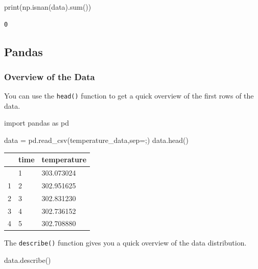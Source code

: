 \documentclass[
  letterpaper,
  DIV=11,
  numbers=noendperiod]{scrreprt}
\newenvironment{Shaded}{\begin{snugshade}}{\end{snugshade}}
\newcommand{\BuiltInTok}[1]{\textcolor[rgb]{0.00,0.23,0.31}{#1}}
\newcommand{\ImportTok}[1]{\textcolor[rgb]{0.00,0.46,0.62}{#1}}
\newcommand{\NormalTok}[1]{\textcolor[rgb]{0.00,0.23,0.31}{#1}}
\newcommand{\OperatorTok}[1]{\textcolor[rgb]{0.37,0.37,0.37}{#1}}
\newcommand{\StringTok}[1]{\textcolor[rgb]{0.13,0.47,0.30}{#1}}
\begin{document}
\begin{Shaded}
\begin{Highlighting}[]
\BuiltInTok{print}\NormalTok{(np.isnan(data).}\BuiltInTok{sum}\NormalTok{())}
\end{Highlighting}
\end{Shaded}

\begin{verbatim}
0
\end{verbatim}

\subsection*{Pandas}\label{pandas-2}

\subsubsection*{Overview of the Data}\label{overview-of-the-data-1}

You can use the \texttt{head()} function to get a quick overview of the
first rows of the data.

\begin{Shaded}
\begin{Highlighting}[]
\ImportTok{import}\NormalTok{ pandas }\ImportTok{as}\NormalTok{ pd}

\NormalTok{data }\OperatorTok{=}\NormalTok{ pd.read\_csv(temperature\_data,sep}\OperatorTok{=}\StringTok{\textquotesingle{};\textquotesingle{}}\NormalTok{)}
\NormalTok{data.head()}
\end{Highlighting}
\end{Shaded}

\begin{longtable}[]{@{}lll@{}}
\toprule\noalign{}
& time & temperature \\
\midrule\noalign{}
\endhead
\bottomrule\noalign{}
\endlastfoot
0 & 1 & 303.073024 \\
1 & 2 & 302.951625 \\
2 & 3 & 302.831230 \\
3 & 4 & 302.736152 \\
4 & 5 & 302.708880 \\
\end{longtable}

The \texttt{describe()} function gives you a quick overview of the data
distribution.

\begin{Shaded}
\begin{Highlighting}[]
\NormalTok{data.describe()}
\end{Highlighting}
\end{Shaded}
\end{document}

